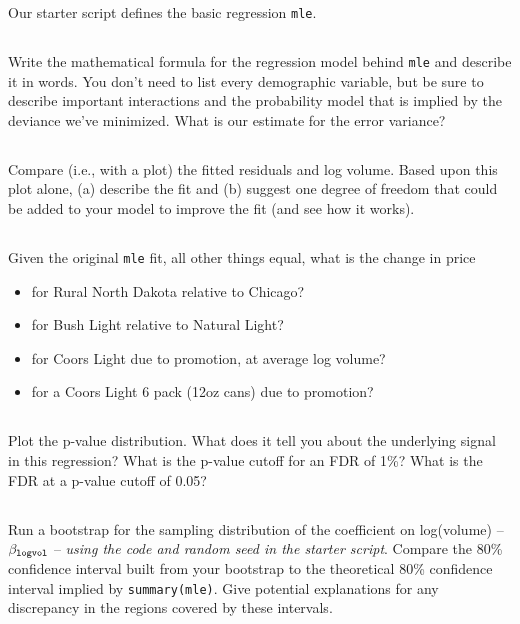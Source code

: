 \documentclass[12pt]{article}
\begin{document}
\bigskip
Our starter script defines the basic regression \texttt{mle}.

\subsection{}
Write the mathematical formula for the regression model behind \texttt{mle} and describe it in words.  You don't need to list every demographic variable, but be sure to describe important interactions and the probability model that is implied by the deviance we've minimized.  What is our estimate for the error variance?


\subsection{} Compare (i.e., with a plot) the fitted residuals and log volume.  Based upon this plot alone, (a) describe the fit and (b) suggest one degree of freedom that could be added to your model to improve the fit (and see how it works).


\subsection{} 
Given the original \texttt{mle} fit, all other things equal, what is the change in price
\begin{itemize}
\item for Rural North Dakota relative to Chicago?
\item for Bush Light relative to Natural Light?
\item for Coors Light due to promotion, at average log volume?
\item for a Coors Light 6 pack (12oz cans) due to promotion?
\end{itemize}


\subsection{} Plot the p-value distribution.  What does it tell you about the underlying signal in this regression?  What is the p-value cutoff for an FDR of 1\%?  What is the FDR at a p-value cutoff of 0.05?

\subsection{} Run a bootstrap for the sampling distribution of the coefficient on log(volume) -- $\beta_{\tt logvol}$  -- \textit{using the code and random seed in the starter script}.  
Compare the 80\% confidence interval built from your bootstrap to the theoretical 80\% confidence interval implied by {\tt summary(mle)}.  Give potential explanations for any discrepancy in the regions covered by these intervals.
\end{document}
